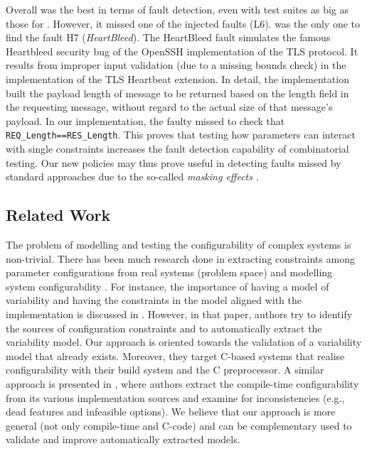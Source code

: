 \begin{tikzborder}{\cite{Gargantini16:validation}}
	Overall \CCi was the best in terms of fault detection, even with test suites as big as those for \ic. However, it missed one of the injected faults (L6).  
	\CCi was the only one to find the fault H7 (\emph{HeartBleed}).  The HeartBleed fault simulates the famous Heartbleed security bug of the OpenSSH implementation of the TLS protocol. It results from improper input validation (due to a missing bounds check) in the implementation of the TLS Heartbeat extension. In detail, the implementation built the payload length of message to be returned based on the length field in the requesting message, without regard to the actual size of that message's payload. In our implementation, the faulty \TLSChecker missed to check that \lstinline[language=comb]$REQ_Length==RES_Length$. This proves that testing how parameters can interact with single constraints increases the fault detection capability of combinatorial testing. Our new policies may thus prove useful in detecting faults missed by standard approaches due to the so-called \emph{masking effects} \cite{YilmazDCP14}. \be


\subsection{Related Work}
\label{sec:validation_relatedwork}

\bb The problem of modelling and testing the configurability of complex systems is non-trivial. There has been much research done in extracting constraints among parameter configurations from real systems (problem space) and modelling system configurability \cite{ShiCD12,henard_towards_2013,YilmazDCP14}.
For instance, the importance of having a model of variability and having the constraints in the model aligned with the implementation is discussed in \cite{NadiBKC14}. However, in that paper, authors try to identify the sources of configuration constraints and to automatically extract the variability model. Our approach is oriented towards the validation of a variability model that already exists. Moreover, they target C-based systems that realise configurability with their build system and the C preprocessor. 
A similar approach is presented in \cite{Tartler:2011}, where authors extract the compile-time configurability from its various implementation sources and examine for inconsistencies (e.g., dead features and infeasible options). We believe that our approach is more general (not only compile-time and C-code) and can be complementary used to validate and improve automatically extracted models. 


\end{tikzborder}
